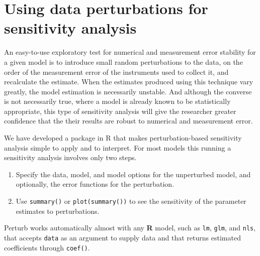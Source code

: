 \documentclass[11pt]{article}
\begin{document}
%
%


\newpage

\section{Using data perturbations for sensitivity analysis}

An easy-to-use exploratory test for numerical and measurement error stability for a given model is 
to introduce small random perturbations to the data, on the order of the measurement error of the 
instruments used to collect it, and recalculate the estimate. When the estimates produced using 
this technique vary greatly, the model estimation is necessarily unstable. And although the 
converse is not necessarily true, where a model is already known to be statistically appropriate,
this type of sensitivity analysis will give the researcher greater confidence that the their 
results are robust to numerical and measurement error.

We have developed a package in R that makes perturbation-based sensitivity
 analysis simple to apply and to interpret. For most models this running
 a sensitivity analysis involves only two steps.                             
\begin{enumerate}
\item Specify the data, model, and model options for the unperturbed model, and optionally,
the error functions for the perturbation.  
\item Use \texttt{summary()} or \texttt{plot(summary())} to see the sensitivity of the parameter estimates
to perturbations.
\end{enumerate}
Perturb works automatically almost with any \textbf{R} model, such as \texttt{lm}, 
\texttt{glm}, and \texttt{nls}, that accepts \texttt{data} 
as an argument to supply data and  that returns estimated coefficients through
\texttt{coef()}.
\end{document}
